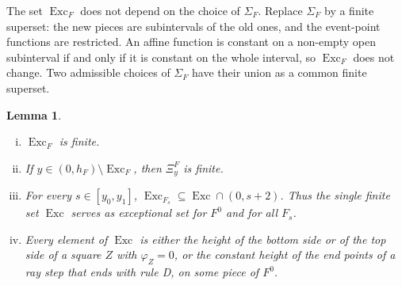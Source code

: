 \documentclass[11pt]{amsart}
\newcommand{\Exc}{\operatorname{Exc}}
\newcommand{\Fz}{F^{0}}
\newcommand{\Fs}{F_{s}}
\newtheorem{lemma}[theorem]{Lemma}
\theoremstyle{definition}
\theoremstyle{remark}
\numberwithin{equation}{section}
\begin{document}
The set $\Exc_F$ does not depend on the choice of $\Sigma_F$. Replace $\Sigma_F$ by a finite superset: the new pieces are subintervals of the old ones, and the event-point functions are restricted. An affine function is constant on a non-empty open subinterval if and only if it is constant on the whole interval, so $\Exc_F$ does not change. Two admissible choices of $\Sigma_F$ have their union as a common finite superset.

\begin{lemma}\label{lem:P4-exc}
\begin{enumerate}[(i)]
\item $\Exc_F$ is finite.
\item If $y\in(0,h_F)\setminus\Exc_F$, then $\Xi^F_y$ is finite.
\item For every $s\in[y_0,y_1]$, $\Exc_{\Fs}\subseteq\Exc\cap(0,s+2)$. Thus the single finite set $\Exc$ serves as exceptional set for $\Fz$ and for all $\Fs$.
\item Every element of $\Exc$ is either the height of the bottom side or of the top side of a square $Z$ with $\varphi_Z=0$, or the constant height of the end points of a ray step that ends with rule D, on some piece of $\Fz$.
\end{enumerate}
\end{lemma}
\end{document}

